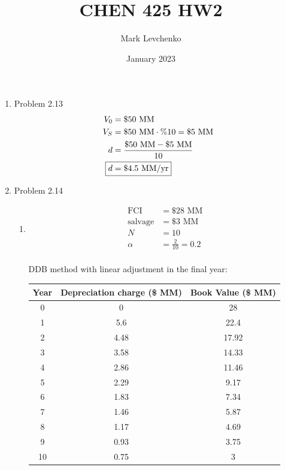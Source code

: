 \documentclass[12pt]{article}
\title{CHEN 425 HW2}
\author{Mark Levchenko}
\date{January 2023}
\begin{document}
\begin{enumerate}
    \item Problem 2.13
    \begin{align*}
        V_0 &= \$ 50 \text{ MM} \\
        V_S &= \$ 50 \text{ MM} \cdot \% 10 = \$ 5 \text{ MM}  \\
        d &= \frac{\$ 50 \text{ MM} - \$ 5 \text{ MM}}{10} \\
        \Aboxed{d &= \$ 4.5 \text{ MM} / \mathrm{yr}}
    \end{align*}

\newpage
    \item Problem 2.14
    \begin{enumerate}
    \item
    \begin{align*}
        \mathrm{FCI} &= \$ 28 \text{ MM} \\
        \mathrm{salvage} &= \$ 3 \text{ MM} \\
        N &= 10 \\
        \alpha &= \frac{2}{10} = 0.2 \\
    \end{align*}

    DDB method with linear adjustment in the final year:

    \begin{tabular}{|c|c|c|}
        \hline
        Year & Depreciation charge (\$ MM) & Book Value (\$ MM) \\
        \hline
        0 & 0 & 28 \\
        1 &	5.6 & 22.4 \\
        2 &	4.48 & 17.92 \\
        3 &	3.58 & 14.33 \\
        4 &	2.86 & 11.46 \\
        5 &	2.29 & 9.17 \\
        6 &	1.83 & 7.34 \\
        7 &	1.46 & 5.87 \\
        8 &	1.17 & 4.69 \\
        9 &	0.93 & 3.75 \\
        10 & 0.75 & 3 \\
        \hline
    \end{tabular}
    



\end{enumerate}
\end{enumerate}
\end{document}
